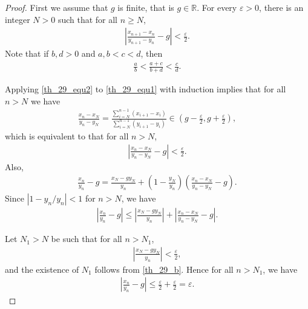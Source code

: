 \documentclass[10pt]{book}
\theoremstyle{definition}
\numberwithin{equation}{chapter}
\begin{document}
\begin{proof}
First we assume that $g$ is finite, that is $g \in \mathbb{R}$. For every $\varepsilon > 0$, there is an integer $N > 0$ such that for all $n \geq N$, 
\begin{align}\label{th_29_equ1}
    \left|\frac{x_{n+1} - x_n}{y_{n+1} - y_n} - g\right| < \frac{\varepsilon}{2}.
\end{align}
Note that if $b,d > 0$ and $a,b < c < d$, then
\begin{align}\label{th_29_equ2}
    \frac{a}{b} < \frac{a+c}{b+d} < \frac{c}{d}.
\end{align}

Applying \eqref{th_29_equ2} to \eqref{th_29_equ1} with induction implies that for all $n > N$ we have
\begin{align*}
    \frac{x_n - x_N}{y_n - y_N} = \frac{\sum^{n-1}_{i=N} (x_{i+1} - x_i)}{\sum^{n-1}_{i=N} (y_{i+1} - y_i)} \in \left(g - \frac{\varepsilon}{2}, g + \frac{\varepsilon}{2}\right),
\end{align*}
which is equivalent to that for all $n > N$,
\begin{align}
    \left|\frac{x_n - x_N}{y_n - y_N} - g\right| < \frac{\varepsilon}{2}.
\end{align}
Also, 
\begin{align*}
    \frac{x_n}{y_n} - g = \frac{x_N - gy_N}{y_n} + \left(1 - \frac{y_N}{y_n}\right) \left(\frac{x_n - x_N}{y_n - y_N} - g\right).
\end{align*}
Since $\left|1 - y_n/y_n\right| < 1$ for $n > N$, we have
\begin{align}
    \left|\frac{x_n}{y_n} - g\right|  \leq \left|\frac{x_N - gy_N}{y_n}\right| + \left|\frac{x_n - x_N}{y_n - y_N} - g\right|.
\end{align}

Let $N_1 > N$ be such that for all $n > N_1$,
\begin{align}
    \left|\frac{x_N - gy_N}{y_n}\right| < \frac{\varepsilon}{2},
\end{align}
and the existence of $N_1$ follows from \ref{th_29_b}. Hence for all $n > N_1$, we have
\begin{align*}
    \left|\frac{x_n}{y_n} - g\right| \leq \frac{\varepsilon}{2} + \frac{\varepsilon}{2} = \varepsilon.
\end{align*}


\end{proof}
\end{document}
